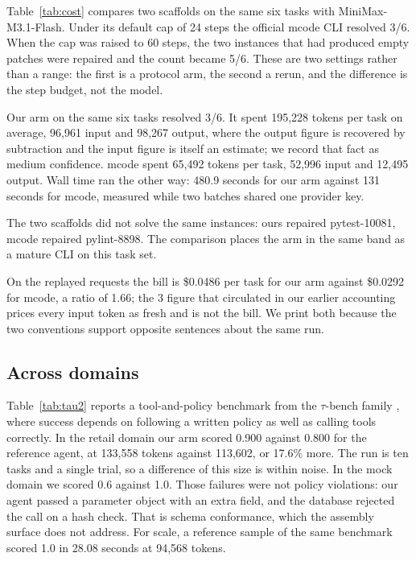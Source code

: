 Table~\ref{tab:cost} compares two scaffolds on the same six tasks with MiniMax-M3.1-Flash. Under its default cap of 24 steps the official mcode CLI resolved 3/6. When the cap was raised to 60 steps, the two instances that had produced empty patches were repaired and the count became 5/6. These are two settings rather than a range: the first is a protocol arm, the second a rerun, and the difference is the step budget, not the model.

Our arm on the same six tasks resolved 3/6. It spent 195,228 tokens per task on average, 96,961 input and 98,267 output, where the output figure is recovered by subtraction and the input figure is itself an estimate; we record that fact as medium confidence. mcode spent 65,492 tokens per task, 52,996 input and 12,495 output. Wall time ran the other way: 480.9 seconds for our arm against 131 seconds for mcode, measured while two batches shared one provider key.

The two scaffolds did not solve the same instances: ours repaired pytest-10081, mcode repaired pylint-8898. The comparison places the arm in the same band as a mature CLI on this task set.

On the replayed requests the bill is \$0.0486 per task for our arm against \$0.0292 for mcode, a ratio of 1.66; the 3 figure that circulated in our earlier accounting prices every input token as fresh and is not the bill. We print both because the two conventions support opposite sentences about the same run.



\subsection{Across domains}

Table~\ref{tab:tau2} reports a tool-and-policy benchmark from the $\tau$-bench family \citep{yao2024taubench}, where success depends on following a written policy as well as calling tools correctly. In the retail domain our arm scored 0.900 against 0.800 for the reference agent, at 133,558 tokens against 113,602, or 17.6\% more. The run is ten tasks and a single trial, so a difference of this size is within noise. In the mock domain we scored 0.6 against 1.0. Those failures were not policy violations: our agent passed a parameter object with an extra field, and the database rejected the call on a hash check. That is schema conformance, which the assembly surface does not address. For scale, a reference sample of the same benchmark scored 1.0 in 28.08 seconds at 94,568 tokens.

